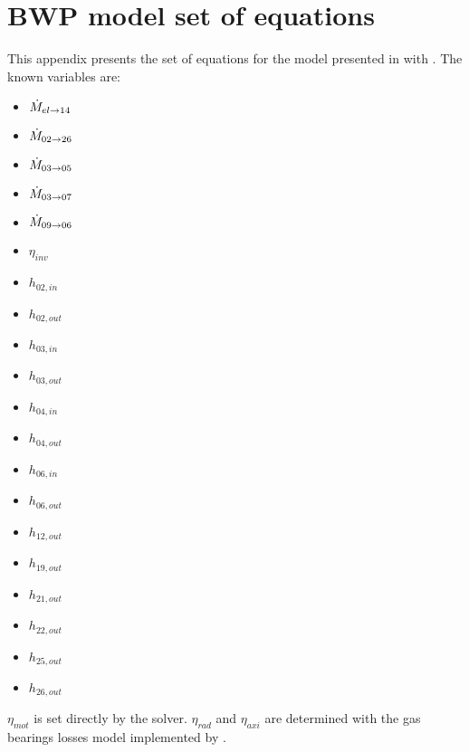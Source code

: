 \chapter{BWP model set of equations}
\label{chap:bwp-eqn}
\resetallacronyms

This appendix presents the set of equations for the model presented in
 with . The
known variables are:

\begin{multicols}{5}
  \begin{itemize}
    \item $\dot{M}_{el \rightarrow 14}$
    \item $\dot{M}_{02 \rightarrow 26}$
    \item $\dot{M}_{03 \rightarrow 05}$
    \item $\dot{M}_{03 \rightarrow 07}$
    \item $\dot{M}_{09 \rightarrow 06}$
    \item $\eta_{inv}$
    \item $h_{02,in}$
    \item $h_{02,out}$
    \item $h_{03,in}$
    \item $h_{03,out}$
    \item $h_{04,in}$
    \item $h_{04,out}$
    \item $h_{06,in}$
    \item $h_{06,out}$
    \item $h_{12,out}$
    \item $h_{19,out}$
    \item $h_{21,out}$
    \item $h_{22,out}$
    \item $h_{25,out}$
    \item $h_{26,out}$
  \end{itemize}
\end{multicols}

$\eta_{mot}$ is set directly by the solver. $\eta_{rad}$ and
$\eta_{axi}$ are determined with the gas bearings losses model
implemented by \citet{schiffmann-2008a}.

